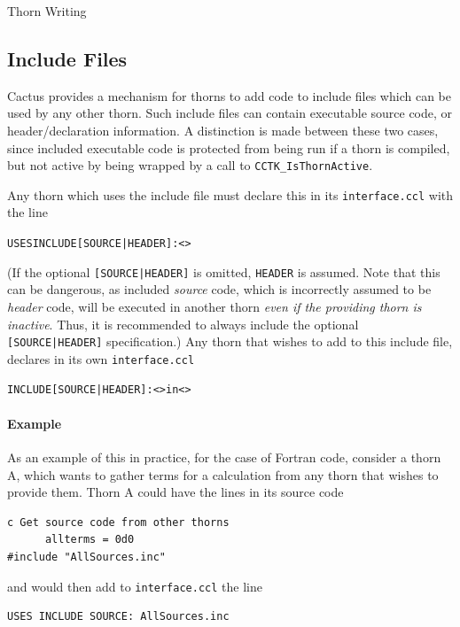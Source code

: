 \begin{cactuspart}{Thorn Writing}
\subsection{Include Files}
\label{sec:includefiles}

Cactus provides a mechanism for thorns to add code to
include files which can be used by any other thorn.
Such include files can contain executable source code, or header/declaration
information. A distinction is made between these two cases, since included
executable code is protected from being run if a thorn is compiled, but
not active by being wrapped by a call to \texttt{CCTK\_IsThornActive}.

Any thorn
which uses the include file must declare this in its
\texttt{interface.ccl} with the line

\begin{alltt}
USES INCLUDE [SOURCE|HEADER]: <>
\end{alltt}

(If the optional \verb![SOURCE|HEADER]! is omitted, \verb|HEADER| is
assumed.  Note that this can be dangerous, as included \emph{source}
code, which is incorrectly assumed to be \emph{header} code, will be
executed in another thorn \emph{even if the providing thorn is
inactive}.  Thus, it is recommended to always include the optional
\verb![SOURCE|HEADER]! specification.)  Any thorn that wishes to add
to this include file, declares in its own \texttt{interface.ccl}

\begin{alltt}
INCLUDE [SOURCE|HEADER]: <> in <>
\end{alltt}

\paragraph{Example}

As an example of this in practice, for the case of Fortran code,
consider a thorn A, which
wants to gather terms for a calculation from any thorn
that wishes to provide them. Thorn A could have
the lines in its source code

\begin{verbatim}
c Get source code from other thorns
      allterms = 0d0
#include "AllSources.inc"
\end{verbatim}
and would then add to \texttt{interface.ccl} the line
\begin{verbatim}
USES INCLUDE SOURCE: AllSources.inc
\end{verbatim}


\end{cactuspart}
